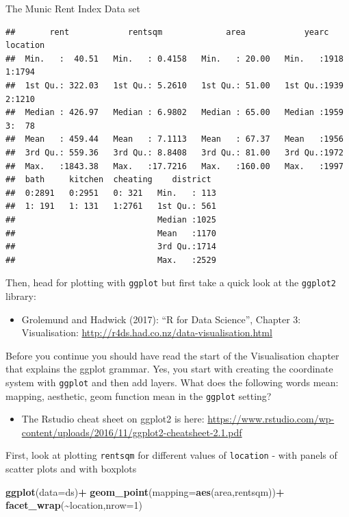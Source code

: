 \documentclass[
  ignorenonframetext,
]{beamer}
\newenvironment{Shaded}{\begin{snugshade}}{\end{snugshade}}
\newcommand{\AttributeTok}[1]{\textcolor[rgb]{0.13,0.29,0.53}{#1}}
\newcommand{\DecValTok}[1]{\textcolor[rgb]{0.00,0.00,0.81}{#1}}
\newcommand{\FunctionTok}[1]{\textcolor[rgb]{0.13,0.29,0.53}{\textbf{#1}}}
\newcommand{\NormalTok}[1]{#1}
\newcommand{\SpecialCharTok}[1]{\textcolor[rgb]{0.81,0.36,0.00}{\textbf{#1}}}
\providecommand{\tightlist}{%
  \setlength{\itemsep}{0pt}\setlength{\parskip}{0pt}}
\begin{document}
\begin{frame}[fragile]
\begin{block}{The Munic Rent Index Data set}
\begin{verbatim}
##       rent            rentsqm             area            yearc      location
##  Min.   :  40.51   Min.   : 0.4158   Min.   : 20.00   Min.   :1918   1:1794  
##  1st Qu.: 322.03   1st Qu.: 5.2610   1st Qu.: 51.00   1st Qu.:1939   2:1210  
##  Median : 426.97   Median : 6.9802   Median : 65.00   Median :1959   3:  78  
##  Mean   : 459.44   Mean   : 7.1113   Mean   : 67.37   Mean   :1956           
##  3rd Qu.: 559.36   3rd Qu.: 8.8408   3rd Qu.: 81.00   3rd Qu.:1972           
##  Max.   :1843.38   Max.   :17.7216   Max.   :160.00   Max.   :1997           
##  bath     kitchen  cheating    district   
##  0:2891   0:2951   0: 321   Min.   : 113  
##  1: 191   1: 131   1:2761   1st Qu.: 561  
##                             Median :1025  
##                             Mean   :1170  
##                             3rd Qu.:1714  
##                             Max.   :2529
\end{verbatim}

Then, head for plotting with \texttt{ggplot} but first take a quick look
at the \texttt{ggplot2} library:

\begin{itemize}
\tightlist
\item
  Grolemund and Hadwick (2017): ``R for Data Science'', Chapter 3:
  Visualisation: \url{http://r4ds.had.co.nz/data-visualisation.html}
\end{itemize}

Before you continue you should have read the start of the Visualisation
chapter that explains the ggplot grammar. Yes, you start with creating
the coordinate system with \texttt{ggplot} and then add layers. What
does the following words mean: mapping, aesthetic, geom function mean in
the \texttt{ggplot} setting?

\begin{itemize}
\tightlist
\item
  The Rstudio cheat sheet on ggplot2 is here:
  \url{https://www.rstudio.com/wp-content/uploads/2016/11/ggplot2-cheatsheet-2.1.pdf}
\end{itemize}

First, look at plotting \texttt{rentsqm} for different values of
\texttt{location} - with panels of scatter plots and with boxplots

\begin{Shaded}
\begin{Highlighting}[]
\FunctionTok{ggplot}\NormalTok{(}\AttributeTok{data=}\NormalTok{ds)}\SpecialCharTok{+}
  \FunctionTok{geom\_point}\NormalTok{(}\AttributeTok{mapping=}\FunctionTok{aes}\NormalTok{(area,rentsqm))}\SpecialCharTok{+}
  \FunctionTok{facet\_wrap}\NormalTok{(}\SpecialCharTok{\textasciitilde{}}\NormalTok{location,}\AttributeTok{nrow=}\DecValTok{1}\NormalTok{)}
\end{Highlighting}
\end{Shaded}


\end{block}
\end{frame}
\end{document}
